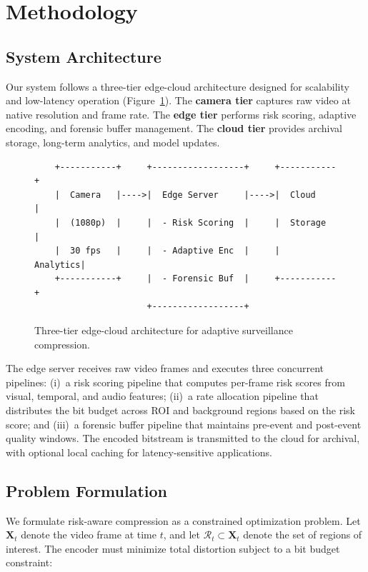 \section{Methodology}
\label{sec:methodology}

\subsection{System Architecture}
\label{sec:architecture}

Our system follows a three-tier edge-cloud architecture designed for scalability and low-latency operation (Figure~\ref{fig:architecture}). The \textbf{camera tier} captures raw video at native resolution and frame rate. The \textbf{edge tier} performs risk scoring, adaptive encoding, and forensic buffer management. The \textbf{cloud tier} provides archival storage, long-term analytics, and model updates.

\begin{figure}[t]
    \centering
    \begin{verbatim}
    +-----------+     +------------------+     +-----------+
    |  Camera   |---->|  Edge Server     |---->|  Cloud    |
    |  (1080p)  |     |  - Risk Scoring  |     |  Storage  |
    |  30 fps   |     |  - Adaptive Enc  |     |  Analytics|
    +-----------+     |  - Forensic Buf  |     +-----------+
                      +------------------+
    \end{verbatim}
    \caption{Three-tier edge-cloud architecture for adaptive surveillance compression.}
    \label{fig:architecture}
\end{figure}

The edge server receives raw video frames and executes three concurrent pipelines: (i)~a risk scoring pipeline that computes per-frame risk scores from visual, temporal, and audio features; (ii)~a rate allocation pipeline that distributes the bit budget across ROI and background regions based on the risk score; and (iii)~a forensic buffer pipeline that maintains pre-event and post-event quality windows. The encoded bitstream is transmitted to the cloud for archival, with optional local caching for latency-sensitive applications.

\subsection{Problem Formulation}
\label{sec:formulation}

We formulate risk-aware compression as a constrained optimization problem. Let $\mathbf{X}_t$ denote the video frame at time $t$, and let $\mathcal{R}_t \subset \mathbf{X}_t$ denote the set of regions of interest. The encoder must minimize total distortion subject to a bit budget constraint:


